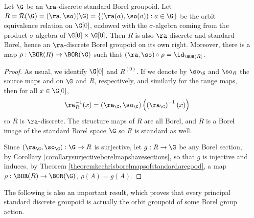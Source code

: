 \begin{theorem}\label{theoremquotientfrommeasuredgroupoidtoorbitrelation}
Let $\G$ be an $\ra$-discrete standard Borel groupoid. Let $R=\mathcal{R}(\G)=(\ra,\so)(\G)=\left\{(\ra(a),\so(a)):a\in\G\right\}$ be the orbit equivalence relation on $\G[0]$, endowed with the $\sigma$-algebra coming from the product $\sigma$-algebra of $\G[0]\times\G[0]$. Then $R$ is also $\ra$-discrete and standard Borel, hence an $\ra$-discrete Borel groupoid on its own right. Moreover, there is a map $\rho:\BOR(R)\to\BOR(\G)$ such that $(\ra,\so)\circ\rho=\id_{\BOR(R)}$.
\end{theorem}
\begin{proof}
As usual, we identify $\G[0]$ and $R^{(0)}$. If we denote by $\so_{\G}$ and $\so_R$ the source maps and on $\G$ and $R$, respectively, and similarly for the range maps, then for all $x\in \G[0]$,
\[\ra_R^{-1}(x)=(\ra_{\G},\so_{\G})\left(\left(\ra_{\G}\right)^{-1}(x)\right)\]
so $R$ is $\ra$-discrete. The structure maps of $R$ are all Borel, and $R$ is a Borel image of the standard Borel space $\G$ so $R$ is standard as well.%

Since $(\ra_{\G},\so_{\G}):\G\to R$ is surjective, let $g:R\to\G$ be any Borel section, by Corollary \ref{corollarysurjectiveborelmapshavesections}, so that $g$ is injective and induces, by Theorem \ref{theoremkechrisborelmapsofstandardaregood}, a map $\rho:\BOR(R)\to\BOR(\G)$, $\rho(A)=g(A)$.\qedhere
\end{proof}

The following is also an important result, which proves that every principal standard discrete groupoid is actually the orbit groupoid of some Borel group action.

